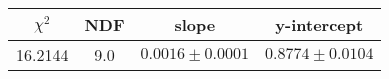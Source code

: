 \begin{tabular}{|c|c|c|c|}

\hline
$\chi^{2}$ & NDF & slope & y-intercept  \\
\hline
16.2144 & 9.0 & $0.0016\pm0.0001$ & $0.8774\pm0.0104$ \\
\hline

\end{tabular}